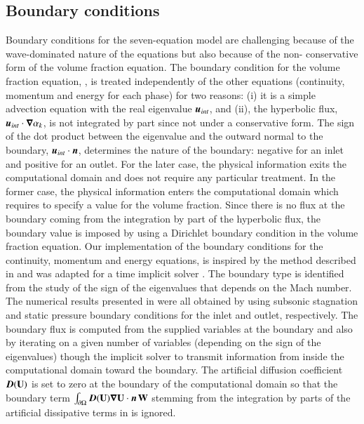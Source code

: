 \documentclass[preprint,10pt]{elsarticle}
\begin{document}
\subsection{Boundary conditions} \label{sec:bc}
%
Boundary conditions for the seven-equation model are challenging because of the wave-dominated nature of the equations but also because of the non-
conservative form of the volume fraction equation. 
The boundary condition for the volume fraction equation, , is treated independently of the other equations (continuity, momentum 
and energy for each phase) for two 
reasons: (i) it is a simple advection equation with the real eigenvalue $\boldsymbol u_{int}$, and (ii), the hyperbolic flux, $\boldsymbol u_{int} \cdot \boldsymbol\nabla \alpha_k$, is not 
integrated by part since not under a 
conservative form. The sign of the dot product between the eigenvalue and the outward normal to the boundary, $\boldsymbol u_{int} \cdot \boldsymbol n$, determines 
the nature of the boundary: negative 
for an inlet and positive for an outlet. For the later case, the physical information exits the computational domain and does not require any particular treatment. 
In the former case, the physical 
information enters the computational domain which requires to specify a value for the volume fraction. Since there is no flux at the boundary coming from the 
integration by part of the hyperbolic 
flux, the boundary value is imposed by using a Dirichlet boundary condition in the volume fraction equation.   
Our implementation of the boundary conditions for the continuity, momentum and energy equations, is inspired by the method described in \cite{SEM} and was 
adapted for a time implicit 
solver \cite{Marco_dissertation}. The boundary type is identified from the study of the sign of the eigenvalues that depends on the Mach number. The 
numerical results presented in 
 were all obtained by using subsonic stagnation and static pressure boundary conditions for the inlet and outlet, respectively. The boundary flux 
is computed from 
the supplied variables at the boundary and also by iterating on a given number of variables (depending on the sign of the eigenvalues) though the implicit 
solver to transmit information from inside the computational domain toward the boundary. 
The artificial diffusion coefficient $\boldsymbol D(\mathbf  U)$ is set to zero at the boundary of the computational 
domain so that the boundary term 
$\int_{\partial \Omega} \boldsymbol D(\mathbf  U) \boldsymbol\nabla \mathbf  U \cdot \boldsymbol n \, \mathbf W$ stemming from the 
integration by parts of the artificial dissipative terms in  is ignored.
%
\end{document}

